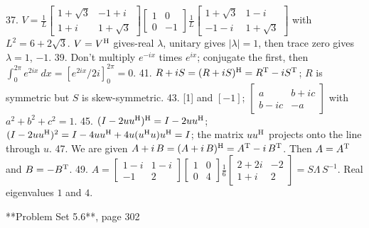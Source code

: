37. \(V=\frac{1}{L}\left[\begin{matrix}1+\sqrt{3}&-1+i\\ 1+i&1+\sqrt{3}\end{matrix}\right]\left[\begin{matrix}1&0\\ 0&-1\end{matrix}\right]\frac{1}{L}\left[\begin{matrix}1+\sqrt{3}&1-i\\ -1-i&1+\sqrt{3}\end{matrix}\right]\) with \(L^{2}=6+2\sqrt{3}\). \(V=V^{\rm H}\) gives-real \(\lambda\), unitary gives \(|\lambda|=1\), then trace zero gives \(\lambda=1\), \(-1\).
39. Don't multiply \(e^{-ix}\) times \(e^{ix}\); conjugate the first, then \(\int_{0}^{2\pi}e^{2ix}\ dx=[e^{2ix}/2i]_{0}^{2\pi}=0\).
41. \(R+iS=(R+iS)^{\rm H}=R^{\rm T}-iS^{\rm T}\); \(R\) is symmetric but \(S\) is skew-symmetric.
43. [1] and \([-1]\); \(\left[\begin{matrix}a&b+ic\\ b-ic&-a\end{matrix}\right]\) with \(a^{2}+b^{2}+c^{2}=1\).
45. \((I-2uu^{\rm H})^{\rm H}=I-2uu^{\rm H}\); \((I-2uu^{\rm H})^{2}=I-4uu^{\rm H}+4u(u^{\rm H}u)u^{\rm H}=I\); the matrix \(uu^{\rm H}\) projects onto the line through \(u\).
47. We are given \(A+i\,B=(A+i\,B)^{\rm H}=A^{\rm T}-i\,B^{\rm T}\). Then \(A=A^{\rm T}\) and \(B=-B^{\rm T}\).
49. \(A=\left[\begin{matrix}1-i&1-i\\ -1&2\end{matrix}\right]\left[\begin{matrix}1&0\\ 0&4\end{matrix}\right]\frac{1}{6}\left[\begin{matrix}2+2i&-2\\ 1+i&2\end{matrix}\right]=S\Lambda\,S^{-1}\). Real eigenvalues \(1\) and \(4\).

**Problem Set 5.6**, page 302

